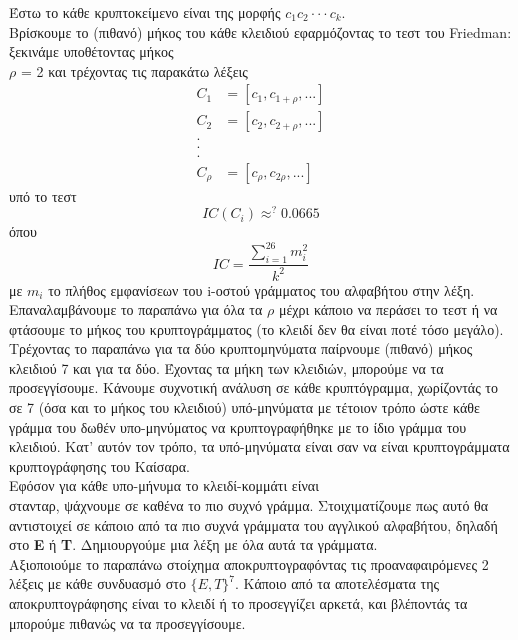 \documentclass{article}
\newcommand{\lt}[1]{\latintext #1\greektext}
\begin{document}
Έστω το κάθε κρυπτοκείμενο είναι της μορφής $c_1c_2\cdot\cdot\cdot c_k$.\\

Βρίσκουμε το (πιθανό) μήκος του κάθε κλειδιού εφαρμόζοντας το τεστ του \lt{Friedman}: ξεκινάμε υποθέτοντας μήκος\\ $\rho$ = 2 και τρέχοντας τις παρακάτω λέξεις
\begin{align*}
    C_1 &= [c_1, c_{1+\rho}, ...]\\
    C_2 &= [c_2, c_{2+\rho}, ...]\\
    .\\
    .\\
    .\\
    C_\rho &= [c_\rho, c_{2\rho}, ...]
\end{align*}
υπό το τεστ
\begin{equation*}
    IC(C_i) \approx^? 0.0665
\end{equation*}
όπου
\begin{equation*}
    IC = \frac{\sum_{i = 1}^{26}m_i^2}{k^2}
\end{equation*}
με $m_i$ το πλήθος εμφανίσεων του \lt{i}-οστού γράμματος του αλφαβήτου στην λέξη.\\

Επαναλαμβάνουμε το παραπάνω για όλα τα $\rho$ μέχρι κάποιο να περάσει το τεστ ή να φτάσουμε το μήκος του κρυπτογράμματος (το κλειδί δεν θα είναι ποτέ τόσο μεγάλο).\\

Τρέχοντας το παραπάνω για τα δύο κρυπτομηνύματα παίρνουμε (πιθανό) μήκος κλειδιού 7 και για τα δύο. Έχοντας τα μήκη των κλειδιών, μπορούμε να τα προσεγγίσουμε. Κάνουμε συχνοτική ανάλυση σε κάθε κρυπτόγραμμα, χωρίζοντάς το σε 7 (όσα και το μήκος του κλειδιού) υπό-μηνύματα με τέτοιον τρόπο ώστε κάθε γράμμα του δωθέν υπο-μηνύματος να κρυπτογραφήθηκε με το ίδιο γράμμα του κλειδιού. Κατ' αυτόν τον τρόπο, τα υπό-μηνύματα είναι σαν να είναι κρυπτογράμματα κρυπτογράφησης του Καίσαρα.\\

Εφόσον για κάθε υπο-μήνυμα το κλειδί-κομμάτι είναι\\ στανταρ, ψάχνουμε σε καθένα το πιο συχνό γράμμα. Στοιχιματίζουμε πως αυτό θα αντιστοιχεί σε κάποιο από τα πιο συχνά γράμματα του αγγλικού αλφαβήτου, δηλαδή στο \textbf{E} ή \textbf{T}. Δημιουργούμε μια λέξη με όλα αυτά τα γράμματα.\\

Αξιοποιούμε το παραπάνω στοίχημα αποκρυπτογραφόντας τις προαναφαιρόμενες 2 λέξεις με κάθε συνδυασμό στο $\{E, T\}^7$. Κάποιο από τα αποτελέσματα της αποκρυπτογράφησης είναι το κλειδί ή το προσεγγίζει αρκετά, και  βλέποντάς τα μπορούμε πιθανώς να τα προσεγγίσουμε.\\
\end{document}
